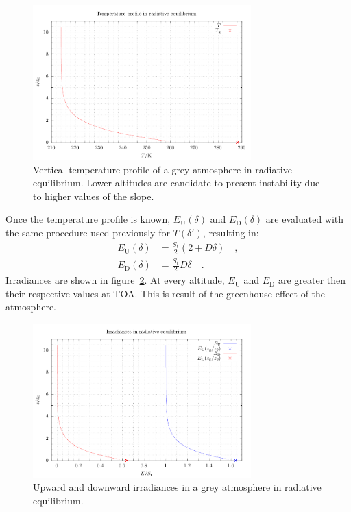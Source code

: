 \documentclass[a4paper,10pt,twocolumn,\classoptions]{article}
\begin{document}
\begin{figure}[h]
  \centering
  \includegraphics*[keepaspectratio=true,width=0.75\textwidth]{temperature_radiative_equilibrium}
  \caption{Vertical temperature profile of a grey atmosphere in radiative equilibrium. Lower altitudes are candidate to present instability due to higher values of the slope.}
  \label{fig:temperature_radiative_equilibrium}
\end{figure}

Once the temperature profile is known, $E_\text{U}(\delta)$ and $E_\text{D}(\delta)$ are evaluated with the same procedure used previously for $T(\delta')$, resulting in:
\begin{align}
  \label{eq:irradiance_upward_solution}
  E_\text{U}(\delta) & = \frac{S_\text{t}}{2} (2 + D \delta) \quad , \\
  \label{eq:irradiance_downward_solution}
  E_\text{D}(\delta) & = \frac{S_\text{t}}{2} D \delta
  \quad .
\end{align}
Irradiances are shown in figure~\ref{fig:irradiance_radiative_equilibrium}. At every altitude, $E_\text{U}$ and $E_\text{D}$ are greater then their respective values at TOA. This is result of the greenhouse effect of the atmosphere.
\begin{figure}[h]
  \centering
  \includegraphics*[keepaspectratio=true,width=0.75\textwidth]{irradiance_radiative_equilibrium}
  \caption{Upward and downward irradiances in a grey atmosphere in radiative equilibrium.}
  \label{fig:irradiance_radiative_equilibrium}
\end{figure}
\end{document}
